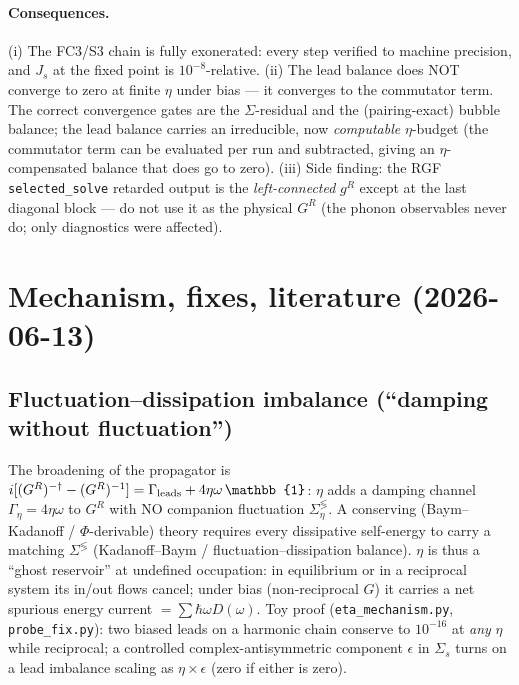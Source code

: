 \documentclass[11pt]{article}
\begin{document}
\paragraph{Consequences.}
(i) The FC3/S3 chain is fully exonerated: every step verified to machine
precision, and $J_s$ at the fixed point is $10^{-8}$-relative.
(ii) The lead balance does NOT converge to zero at finite $\eta$ under
bias --- it converges to the commutator term. The correct convergence
gates are the $\Sigma$-residual and the (pairing-exact) bubble balance;
the lead balance carries an irreducible, now \emph{computable}
$\eta$-budget (the commutator term can be evaluated per run and
subtracted, giving an $\eta$-compensated balance that does go to zero).
(iii) Side finding: the RGF \texttt{selected\_solve} retarded output is
the \emph{left-connected} $g^R$ except at the last diagonal block --- do
not use it as the physical $G^R$ (the phonon observables never do; only
diagnostics were affected).

\section{Mechanism, fixes, literature (2026-06-13)}

\subsection{Fluctuation--dissipation imbalance (``damping without fluctuation'')}
The broadening of the propagator is
$i[(G^R)^{-\dagger}-(G^R)^{-1}]=\Gamma_{\rm leads}+4\eta\omega\,\mathbb{1}$:
$\eta$ adds a damping channel $\Gamma_\eta=4\eta\omega$ to $G^R$ with NO
companion fluctuation $\Sigma_\eta^{\lessgtr}$. A conserving (Baym--Kadanoff /
$\Phi$-derivable) theory requires every dissipative self-energy to carry a
matching $\Sigma^{\lessgtr}$ (Kadanoff--Baym / fluctuation--dissipation
balance). $\eta$ is thus a ``ghost reservoir'' at undefined occupation: in
equilibrium or in a reciprocal system its in/out flows cancel; under bias
(non-reciprocal $G$) it carries a net spurious energy current
$=\sum\hbar\omega D(\omega)$. Toy proof (\texttt{eta\_mechanism.py},
\texttt{probe\_fix.py}): two biased leads on a harmonic chain conserve to
$10^{-16}$ at \emph{any} $\eta$ while reciprocal; a controlled
complex-antisymmetric component $\epsilon$ in $\Sigma_s$ turns on a lead
imbalance scaling as $\eta\times\epsilon$ (zero if either is zero).
\end{document}
